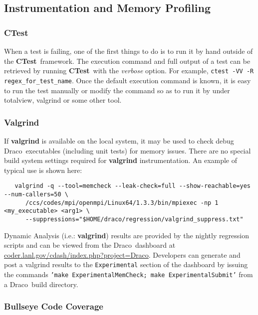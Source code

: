 \documentclass[11pt]{nmemo}
\newcommand{\comp}[1]{\normalfont\footnotesize\texttt{#1}\normalsize}
\newcommand{\draco}{{\normalfont\sffamily Draco}}
\newcommand{\ctest}{{\normalfont\bfseries CTest}}
\begin{document}
\subsection{Instrumentation and Memory Profiling}

\subsubsection{CTest}
When a test is failing, one of the first things to do is to run it by hand outside of the \ctest\ framework.  The execution command and full output of a test can be retrieved by running \ctest\ with the \textit{verbose} option. For example, \comp{ctest -VV -R regex\_for\_test\_name}.  Once the default execution command is known, it is easy to run the test manually or modify the command so as to run it by under totalview, valgrind or some other tool. 

\subsubsection{Valgrind}

If \textbf{valgrind} is available on the local system, it may be used
to check debug \draco\ executables (including unit tests) for memory
issues. There are no special build system settings required for
\textbf{valgrind} instrumentation.  An example of typical use is shown
here:

\footnotesize
\begin{verbatim}
   valgrind -q --tool=memcheck --leak-check=full --show-reachable=yes --num-callers=50 \
      /ccs/codes/mpi/openmpi/Linux64/1.3.3/bin/mpiexec -np 1 <my_executable> <arg1> \
      --suppressions="$HOME/draco/regression/valgrind_suppress.txt"
\end{verbatim}
\normalsize

Dynamic Analysis (i.e.: \textbf{valgrind}) results are provided by the
nightly regression scripts and can be viewed from the
\draco\ dashboard at
\url{coder.lanl.gov/cdash/index.php?project=Draco}.  Developers can
generate and post a valgrind results to the \comp{Experimental}
section of the dashboard by issuing the commands \comp{'make
  ExperimentalMemCheck; make ExperimentalSubmit'} from a \draco\ build
directory.

\subsubsection{Bullseye Code Coverage}
\end{document}
